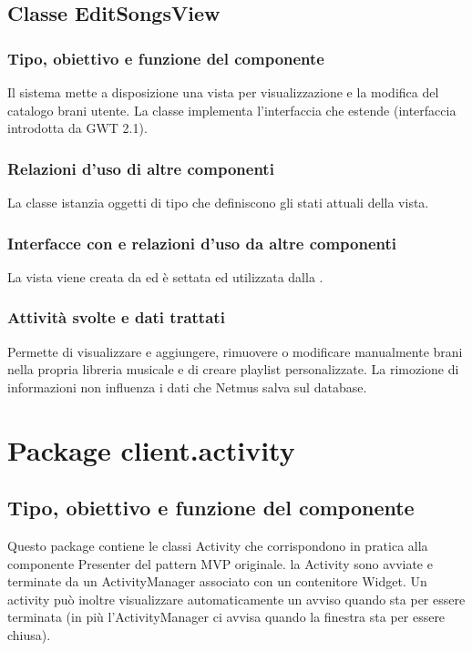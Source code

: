 \subsection{Classe EditSongsView}
\subsubsection*{Tipo, obiettivo e funzione del componente}
Il sistema mette a disposizione una vista per visualizzazione e la modifica del
catalogo brani utente. La classe  implementa l'interfaccia
 che estende  (interfaccia introdotta da GWT
2.1).
\subsubsection*{Relazioni d'uso di altre componenti}
La classe istanzia oggetti di tipo  che definiscono gli stati
attuali della vista.
\subsubsection*{Interfacce con e relazioni d'uso da altre componenti}
La vista viene creata da  ed \`e settata ed utilizzata dalla
.
\subsubsection*{Attivit\`a svolte e dati trattati}
Permette di visualizzare e aggiungere, rimuovere o modificare manualmente brani
nella propria libreria musicale e di creare playlist personalizzate. La
rimozione di informazioni non influenza i dati che Netmus salva sul database.

\newpage
\section{Package client.activity} %
\subsection*{Tipo, obiettivo e funzione del componente}
Questo package contiene le classi Activity che corrispondono in pratica alla
componente Presenter del pattern MVP originale. la Activity sono avviate e
terminate da un ActivityManager associato con un contenitore Widget. Un activity
pu\`o inoltre visualizzare automaticamente un avviso quando sta per essere
terminata (in pi\`u l'ActivityManager ci avvisa quando la finestra sta per
essere chiusa).


